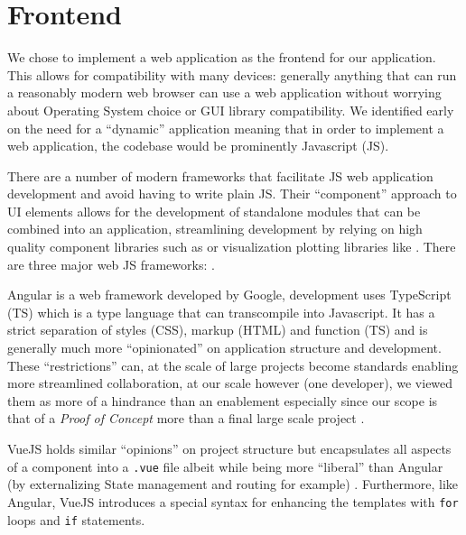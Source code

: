 \documentclass{l4proj}
\begin{document}
\section{Frontend}

We chose to implement a web application as the frontend for our application.
This allows for compatibility with many devices: generally anything that can run a reasonably modern web browser can use a web application without worrying about Operating System choice or GUI library compatibility.
We identified early on the need for a ``dynamic'' application meaning that in order to implement a web application, the codebase would be prominently Javascript (JS).

There are a number of modern frameworks that facilitate JS web application development and avoid having to write plain JS.
Their ``component'' approach to UI elements allows for the development of standalone modules that can be combined into an application, streamlining development by relying on high quality component libraries such as \textcite{Materialui2020} or visualization plotting libraries like \textcite{Recharts2020}.
There are three major web JS frameworks: \textcite{Angular2020,FacebookReact2020,VuejsVue2020}.

Angular is a web framework developed by Google, development uses TypeScript (TS) which is a type language that can transcompile into Javascript.
It has a strict separation of styles (CSS), markup (HTML) and function (TS) and is generally much more ``opinionated'' on application structure and development.
These ``restrictions'' can, at the scale of large projects become standards enabling more streamlined collaboration, at our scale however (one developer), we viewed them as more of a hindrance than an enablement especially since our scope is that of a \textit{Proof of Concept} more than a final large scale project \autocite{wohlgethanSupportingWebDevelopmentDecisions2018}.

VueJS holds similar ``opinions'' on project structure but encapsulates all aspects of a component into a \lstinline{.vue} file albeit while being more ``liberal'' than Angular (by externalizing State management and routing for example) \autocite{wohlgethanSupportingWebDevelopmentDecisions2018}.
Furthermore, like Angular, VueJS introduces a special syntax for enhancing the templates with \lstinline{for} loops and \lstinline{if} statements.
\end{document}
